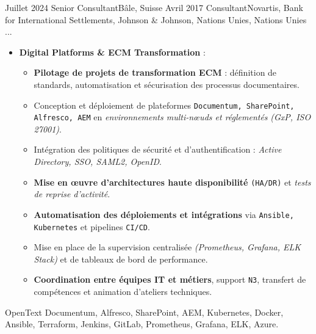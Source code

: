 %
%
%

\begin{experiences}

\consultantexperience
    {Juillet 2024} {Senior Consultant}{}{Bâle, Suisse}
    {Avril 2017}    {Consultant}{Novartis, Bank for International Settlements, Johnson \& Johnson, Nations Unies, Nations Unies ...} {
        \begin{itemize}[left=0pt,label={},itemsep=0.5em]
        \vspace{0.3em}  %
          \item \textbf{Digital Platforms \& ECM Transformation} :
            \begin{itemize}[itemsep=0.2em,topsep=0.2em,parsep=0pt]
              \small
              \item \textbf{Pilotage de projets de transformation ECM} : définition de standards, automatisation et sécurisation des processus documentaires.
              \item Conception et déploiement de plateformes \texttt{Documentum, SharePoint, Alfresco, AEM} en \emph{environnements multi-nœuds et réglementés} \emph{(GxP, ISO 27001)}.
              \item Intégration des politiques de sécurité et d'authentification : \emph{Active Directory, SSO, SAML2, OpenID}.
              \item \textbf{Mise en œuvre d'architectures haute disponibilité} \texttt{(HA/DR)} et \emph{tests de reprise d'activité}.
              \item \textbf{Automatisation des déploiements et intégrations} via \texttt{Ansible, Kubernetes} et pipelines \texttt{CI/CD}.
              \item Mise en place de la supervision centralisée \emph{(Prometheus, Grafana, ELK Stack)} et de tableaux de bord de performance.
              \item \textbf{Coordination entre équipes IT et métiers}, support \texttt{N3}, transfert de compétences et animation d'ateliers techniques.
            \end{itemize}
        \end{itemize}
        \vspace{0.3em}
    }
    {OpenText Documentum, Alfresco, SharePoint, AEM, Kubernetes, Docker, Ansible, Terraform, Jenkins, GitLab, Prometheus, Grafana, ELK, Azure.}
    

\end{experiences}
